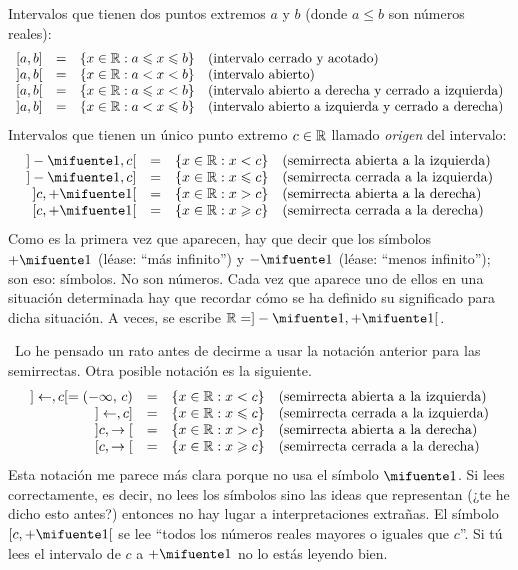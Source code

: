 \documentclass[oneside,spanish,2m,twoside,svgnames,x11names,HTML,12pt]{libro-matua}\usepackage[]{graphicx}\usepackage[]{color}
\begin{document}
\noindent Intervalos que tienen dos puntos extremos $a$ y $b$ (donde
$a\leq b$ son números reales): 
\[
\begin{array}{rcll}
\mbox{\ensuremath{[a,b]}} & = & \{x\in\mathbb R:a\leqslant x\leqslant b\} & \textrm{(intervalo cerrado y acotado)}\\
\mbox{\ensuremath{]a,b[}} & = & \{x\in\mathbb R:a<x<b\} & \textrm{(intervalo abierto)}\\
\mbox{\ensuremath{[a,b[}} & = & \{x\in\mathbb R:a\leqslant x<b\} & \textrm{(intervalo abierto a derecha y cerrado a izquierda)}\\
\mbox{\ensuremath{]a,b]}} & = & \{x\in\mathbb R:a<x\leqslant b\} & \textrm{(intervalo abierto a izquierda y cerrado a derecha)}
\end{array}
\]
Intervalos que tienen un único punto extremo $c\in\mathbb R$ llamado \emph{origen}
del intervalo: 
\[
\begin{array}{rcll}
\mbox{\ensuremath{]-\infinity,c[}} & = & \{x\in\R:x<c\} & \textrm{(semirrecta abierta a la izquierda)}\\
\mbox{\ensuremath{]-\infinity,c]}} & = & \{x\in\R:x\leqslant c\} & \textrm{(semirrecta cerrada a la izquierda)}\\
\mbox{\ensuremath{]c,+\infinity[}} & = & \{x\in\R:x>c\} & \textrm{(semirrecta abierta a la derecha)}\\
\mbox{\ensuremath{[c,+\infinity[}} & = & \{x\in\R:x\geqslant c\} & \textrm{(semirrecta cerrada a la derecha)}
\end{array}
\]
Como es la primera vez que aparecen, hay que decir que los símbolos
$+\infinity$ (léase: ``más infinito'') y $-\infinity$ (léase:
``menos infinito''); son eso: símbolos. No son números. Cada vez
que aparece uno de ellos en una situación determinada hay que recordar
cómo se ha definido su significado para dicha situación. A veces,
se escribe $\R=]-\infinity,+\infinity[$.

\ Lo
he pensado un rato antes de decirme a usar la notación anterior para
las semirrectas. Otra posible notación es la siguiente. 
\[
\begin{array}{rcll}
\mbox{\ensuremath{]\leftarrow,c[=\left(-\infty,\,c\right)}} & = & \{x\in\mathbb R:x<c\} & \textrm{(semirrecta abierta a la izquierda)}\\
\mbox{\ensuremath{]\leftarrow,c]}} & = & \{x\in\mathbb R:x\leqslant c\} & \textrm{(semirrecta cerrada a la izquierda)}\\
\mbox{\ensuremath{]c,\rightarrow[}} & = & \{x\in\mathbb R:x>c\} & \textrm{(semirrecta abierta a la derecha)}\\
\mbox{\ensuremath{[c,\rightarrow[}} & = & \{x\in\mathbb R:x\geqslant c\} & \textrm{(semirrecta cerrada a la derecha)}
\end{array}
\]
Esta notación me parece más clara porque no usa el símbolo $\infinity$.
Si lees correctamente, es decir, no lees los símbolos sino las ideas
que representan (¿te he dicho esto antes?) entonces no hay lugar a
interpretaciones extrañas. El símbolo $[c,+\infinity[$ se lee ``todos
los números reales mayores o iguales que $c$''. Si tú lees el intervalo
de $c$ a $+\infinity$ no lo estás leyendo bien.
\end{document}

